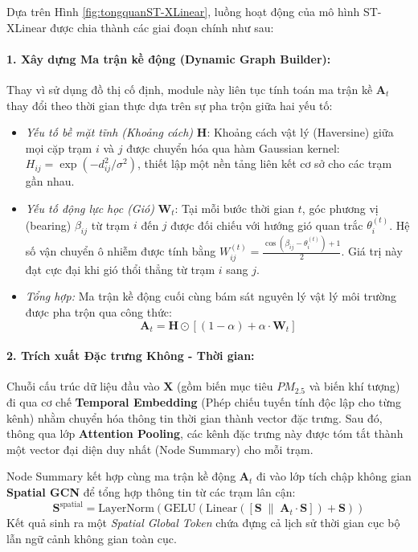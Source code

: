 Dựa trên Hình \ref{fig:tongquanST-XLinear}, luồng hoạt động của mô hình ST-XLinear được chia thành các giai đoạn chính như sau:

\paragraph{1. Xây dựng Ma trận kề động (Dynamic Graph Builder):} 
Thay vì sử dụng đồ thị cố định, module này liên tục tính toán ma trận kề $\mathbf{A}_t$ thay đổi theo thời gian thực dựa trên sự pha trộn giữa hai yếu tố:
\begin{itemize}
    \item \textit{Yếu tố bề mặt tĩnh (Khoảng cách)} $\mathbf{H}$: Khoảng cách vật lý (Haversine) giữa mọi cặp trạm $i$ và $j$ được chuyển hóa qua hàm Gaussian kernel: $H_{ij} = \exp(-d_{ij}^2/\sigma^2)$, thiết lập một nền tảng liên kết cơ sở cho các trạm gần nhau.
    \item \textit{Yếu tố động lực học (Gió)} $\mathbf{W}_t$: Tại mỗi bước thời gian $t$, góc phương vị (bearing) $\beta_{ij}$ từ trạm $i$ đến $j$ được đối chiếu với hướng gió quan trắc $\theta_i^{(t)}$. Hệ số vận chuyển ô nhiễm được tính bằng $W_{ij}^{(t)} = \frac{\cos(\beta_{ij} - \theta_i^{(t)}) + 1}{2}$. Giá trị này đạt cực đại khi gió thổi thẳng từ trạm $i$ sang $j$.
    \item \textit{Tổng hợp:} Ma trận kề động cuối cùng bám sát nguyên lý vật lý môi trường được pha trộn qua công thức:
    \begin{equation}
        \mathbf{A}_t = \mathbf{H} \odot \left[(1 - \alpha) + \alpha \cdot \mathbf{W}_t\right]
    \end{equation}
\end{itemize}

\paragraph{2. Trích xuất Đặc trưng Không - Thời gian:}
Chuỗi cấu trúc dữ liệu đầu vào $\mathbf{X}$ (gồm biến mục tiêu $PM_{2.5}$ và biến khí tượng) đi qua cơ chế \textbf{Temporal Embedding} (Phép chiếu tuyến tính độc lập cho từng kênh) nhằm chuyển hóa thông tin thời gian thành vector đặc trưng. Sau đó, thông qua lớp \textbf{Attention Pooling}, các kênh đặc trưng này được tóm tắt thành một vector đại diện duy nhất (Node Summary) cho mỗi trạm.

Node Summary kết hợp cùng ma trận kề động $\mathbf{A}_t$ đi vào lớp tích chập không gian \textbf{Spatial GCN} để tổng hợp thông tin từ các trạm lân cận:
\begin{equation}
    \mathbf{S}^{\text{spatial}} = \text{LayerNorm}\left(\text{GELU}\left(\text{Linear}\left([\mathbf{S} \;\|\; \mathbf{A}_t \cdot \mathbf{S}]\right) + \mathbf{S}\right)\right)
\end{equation}
Kết quả sinh ra một \textit{Spatial Global Token} chứa đựng cả lịch sử thời gian cục bộ lẫn ngữ cảnh không gian toàn cục.

